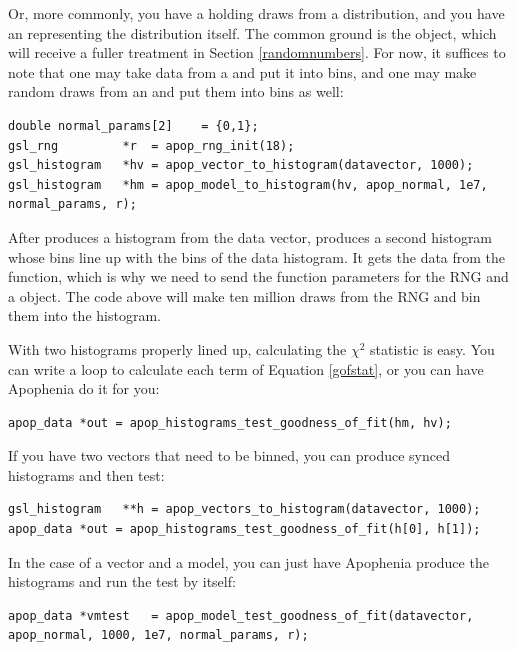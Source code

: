 Or, more commonly, you have a  holding
draws from a distribution, and you have an 
representing the distribution itself. The common ground is the
 object, which will receive a fuller treatment in
Section \ref{randomnumbers}. For now, it suffices to note that one may
take data from a  and put it into bins, and one may make
random draws from an  and put them into bins as well: 
\begin{lstlisting}
double normal_params[2]    = {0,1};
gsl_rng         *r  = apop_rng_init(18);
gsl_histogram   *hv = apop_vector_to_histogram(datavector, 1000);
gsl_histogram   *hm = apop_model_to_histogram(hv, apop_normal, 1e7, normal_params, r);
\end{lstlisting}

After  produces a histogram from the
data vector,  produces a second histogram
whose bins line up with the bins of the data histogram. It gets the data
from the  function, which is why we need to
send the function parameters for the RNG and a 
object. The code above will make ten million draws from the RNG and bin
them into the  histogram.

With two histograms properly lined up, calculating the $\chi^2$
statistic is easy. You can write a  loop to calculate each
term of Equation \ref{gofstat}, or you can have Apophenia do it for you:
\begin{lstlisting}
apop_data *out = apop_histograms_test_goodness_of_fit(hm, hv);
\end{lstlisting}


If you have two vectors that need to be binned, you can produce 
synced histograms and then test:
\begin{lstlisting}
gsl_histogram   **h = apop_vectors_to_histogram(datavector, 1000);
apop_data *out = apop_histograms_test_goodness_of_fit(h[0], h[1]);
\end{lstlisting}
In the case of a vector and a model, you can just have
Apophenia produce the histograms and run the test by itself:
\begin{lstlisting}
apop_data *vmtest   = apop_model_test_goodness_of_fit(datavector, apop_normal, 1000, 1e7, normal_params, r);
\end{lstlisting}

